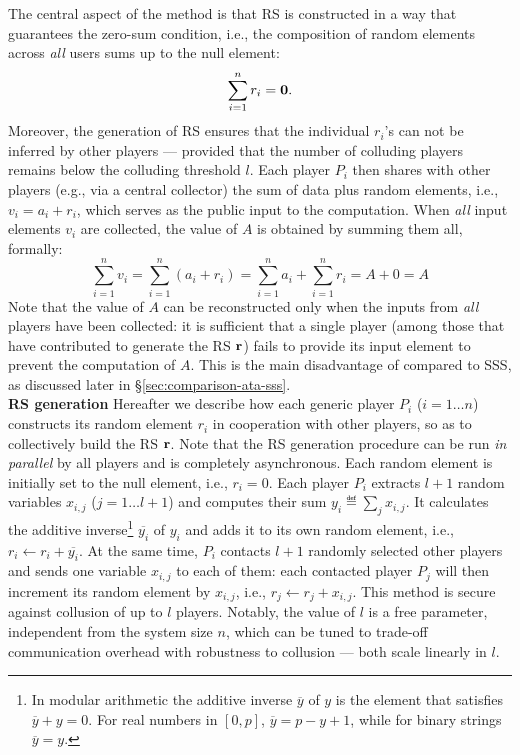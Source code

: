 \documentclass{sig-alternate}
\begin{document}
The central aspect of the \ata method is that RS is constructed in a way that guarantees the zero-sum condition, i.e., the composition of random elements across {\em all} users sums up to the null element: 
\begin{equation}
\sum_{i=1}^{n}{r_i} = \bf{0}. \label{eq:zero-forcing}
\end{equation}
Moreover, the generation of RS ensures that the individual $r_i$'s can not be inferred by other players --- provided that the number of colluding players remains below the colluding threshold $l$. 
Each player $P_i$ then shares with other players (e.g., via a central collector) the sum of data plus random elements, i.e., $v_i=a_i+r_i$, which serves as the public input to the computation.
When {\em all} input elements $v_i$ are collected, the value of $A$ is obtained by summing them all, formally:
\begin{equation}
\sum_{i=1}^{n}{v_i} = \sum_{i=1}^{n}{(a_i + r_i)} = \sum_{i=1}^{n}{a_i} + \sum_{i=1}^{n}{r_i} = A + 0 = A
\end{equation}
Note that the value of $A$ can be reconstructed only when the inputs from {\em all} players have been collected: it is sufficient that a single player (among those that have contributed to generate the RS ${\bf{r}}$) fails to provide its input element to prevent the computation of $A$. This is the main disadvantage of \ata compared to SSS, as discussed later in \S \ref{sec:comparison-ata-sss}.\\

{\bf RS generation}
Hereafter we describe how each generic player $P_i$ ($i=1 \ldots n$) constructs its random element $r_i$ in cooperation with other players, so as to collectively build the RS  $\bf{r}$.
Note that the RS generation procedure can be run {\em in parallel} by all players and is completely asynchronous.
Each random element is initially set to the null element, i.e., $r_i=0$. Each player $P_i$ extracts $l+1$ random variables $x_{i,j}$ ($j=1 \ldots l+1$) and computes their sum $y_i \eqdef \sum_j{x_{i,j}}$.
It calculates  the additive inverse\footnote{In modular arithmetic  the additive inverse $\overline{y}$ of $y$ is the element that satisfies $\overline{y}+y = 0$. For real numbers in $[0,p]$, $\overline{y}= p-y+1$, while for binary strings $\overline{y}=y$. } $\overline{y_i}$ of $y_i$ and adds it to its own random element, i.e., $r_i \leftarrow r_i + \overline{y_i}$.
At the same time, $P_i$  contacts $l+1$ randomly selected other players and  sends one variable $x_{i,j}$ to each of them: 
each contacted player $P_j$ will then increment its random element by  $x_{i,j}$, i.e., $r_j \leftarrow r_j + x_{i,j}$.
This method is secure against collusion of up to $l$ players.
Notably, the value of $l$ is a free parameter,   independent from the system size $n$, which can be tuned to trade-off communication overhead with robustness to collusion --- both scale linearly in $l$.\\
\end{document}
